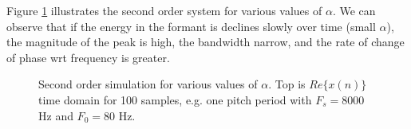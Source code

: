 \documentclass{article}
\begin{document}
Figure \ref{fig:sec_order} illustrates the second order system for various values of $\alpha$. We can observe that if the energy in the formant is declines slowly over time (small $\alpha$), the magnitude of the peak is high, the bandwidth narrow, and the rate of change of phase wrt frequency is greater.
 	
\begin{figure}
\caption{Second order simulation for various values of $\alpha$. Top is $Re\{x(n)\}$ time domain for 100 samples, e.g. one pitch period with $F_s=8000$ Hz and $F_0=80$ Hz.}
\label{fig:sec_order}
\begin{center}

\end{center}
\end{figure}



\end{document}

